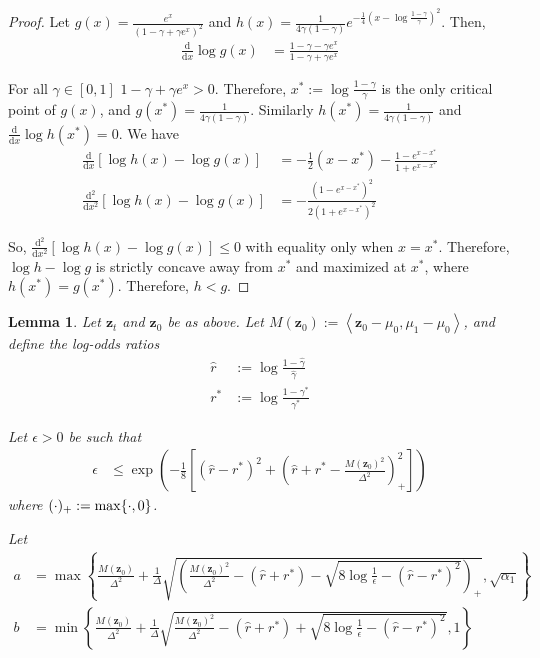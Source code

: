\documentclass[11pt]{article}
\newcommand{\fitparenth}[1]{\left(#1\right)}
\newcommand{\fitbracket}[1]{\left[#1\right]}
\newcommand{\inprod}[1]{\left\langle#1\right\rangle}
\newcommand{\vect}[1]{\mathbf{#1}}
\theoremstyle{plain}
\newtheorem{lemma}[theorem]{Lemma}
\newcommand{\1}{\mathbbm{1}}
\DeclarePairedDelimiter{\set}{\lbrace}{\rbrace}
\newcommand{\separation}{\Delta}
\begin{document}
\begin{appendices}
\begin{proof}
    Let $g(x)= \frac{e^x}{(1-\gamma + \gamma e^x)^2}$ and $h(x)=\frac{1}{4\gamma (1-\gamma)}e^{-\frac{1}{4}\fitparenth{x-\log \frac{1-\gamma}{\gamma}}^2}$. Then, 
    \begin{align*}
        \frac{\mathrm d}{\mathrm d x}\log g(x) &=\frac{1-\gamma -\gamma e^x}{1-\gamma + \gamma e^x}
    \end{align*}

    For all $\gamma\in [0,1]$ $1-\gamma + \gamma e^x>0$. Therefore, $x^*:=\log \frac{1-\gamma}{\gamma}$ is the only critical point of $g(x)$, and $g(x^*)=\frac{1}{4\gamma\fitparenth{1-\gamma}}$. Similarly $h(x^*)=\frac{1}{4\gamma\fitparenth{1-\gamma}}$ and $\frac{\mathrm d}{\mathrm d x}\log h(x^*)=0$. We have
    \begin{align*}
        \frac{\mathrm{d}}{\mathrm{d}x}[\log h(x)-\log g(x)]
        &=-\frac{1}{2}(x-x^*) - \frac{1-e^{x-x^*}}{1+e^{x-x^*}}
        \\
        \frac{\mathrm{d}^2}{\mathrm{d}x^2}[\log h(x)-\log g(x)]
        &= -\frac{(1-e^{x-x^*})^2}{2(1+e^{x-x^*})^2}
    \end{align*}
    
    So, $\frac{\mathrm{d}^2}{\mathrm{d}x^2}[\log h(x)-\log g(x)]\leq 0$ with equality only when $x=x^*$. Therefore, $\log h-\log g$ is strictly concave away from $x^*$ and maximized at $x^*$, where $h(x^*)=g(x^*)$. Therefore, $h< g$.
\end{proof}

\begin{lemma}\label{lemma:bounds}
    Let $\vect z_t$ and $\vect z_0$ be as above. Let $M(\vect z_0):=\inprod{\vect z_0 - \mu_0, \mu_1 - \mu_0}$, and define the log-odds ratios 
    \begin{align*}
        \hat r &:= \log \frac{1-{\hat\gamma}}{{\hat\gamma}}
        \\
        r^* &:= \log \frac{1-\gamma^*}{\gamma^*}
    \end{align*}
    
    Let $\epsilon>0$ be such that 
    \begin{align*}
    \epsilon &\leq \exp\fitparenth{-\frac{1}{8}\fitbracket{(\hat r-r^*)^2 + \fitparenth{\hat r+r^*-\frac{M(\vect z_0)^2}{\separation^2}}_+^2}}
    \end{align*}
    where $(\cdot)_+:= \max\set{\cdot, 0}$.
    
    Let
    \begin{align*}
        a&=\max\left\{\frac{M(\vect z_0)}{\separation^2} + \frac{1}{\separation}\sqrt{\fitparenth{\frac{M(\vect z_0)^2}{\separation^2} - \fitparenth{ \hat r + r^*}-\sqrt{8\log \frac{1}{\epsilon}-\fitparenth{\hat r-r^*}^2}}_+},\sqrt{\alpha_1}\right\}
        \\
        b&= \min\left\{\frac{M(\vect z_0)}{\separation^2} + \frac{1}{\separation}\sqrt{\frac{M(\vect z_0)^2}{\separation^2} - \fitparenth{ \hat r + r^*}+\sqrt{8\log \frac{1}{\epsilon}-\fitparenth{\hat r-r^*}^2}},1\right\}
    \end{align*}


\end{lemma}
\end{appendices}
\end{document}
